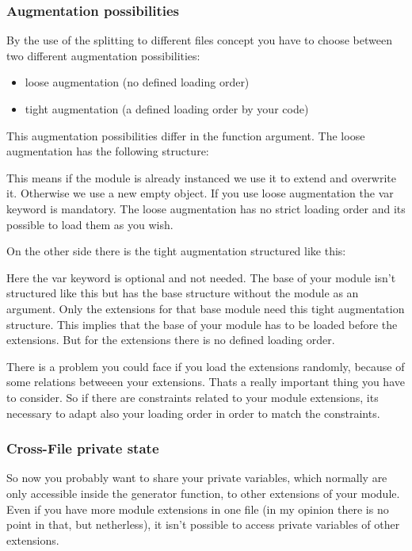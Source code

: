 \documentclass{bioinfo}
\begin{document}
\subsubsection{Augmentation possibilities}
By the use of the splitting to different files concept you have to choose between two different
augmentation possibilities:
\begin{itemize}
    \item loose augmentation (no defined loading order)
    \item tight augmentation (a defined loading order by your code)
\end{itemize}
This augmentation possibilities differ in the function argument.
The loose augmentation has the following structure:


This means if the module is already instanced we use it to extend and overwrite it.
Otherwise we use a new empty object. If you use loose augmentation the var keyword
is mandatory. The loose augmentation has no strict loading order and its possible to load them
as you wish.

On the other side there is the tight augmentation structured like this:


Here the var keyword is optional and not needed. The base of your module isn't structured
like this but has the base structure without the module as an argument. Only the extensions for
that base module need this tight augmentation structure. This implies that the base of
your module has to be loaded before the extensions. But for the extensions there is no defined
loading order.

There is a problem you could face if you load the extensions randomly, because of some relations
betweeen your extensions. Thats a really important thing you have to consider. So if there are
constraints related to your module extensions, its necessary to adapt also your loading
order in order to match the constraints.

\subsubsection{Cross-File private state}
So now you probably want to share your private variables, which normally are only accessible
inside the generator function, to other extensions of your module. Even if you have
more module extensions in one file (in my opinion there is no point in that, but netherless),
it isn't possible to access private variables of other extensions.
\end{document}

